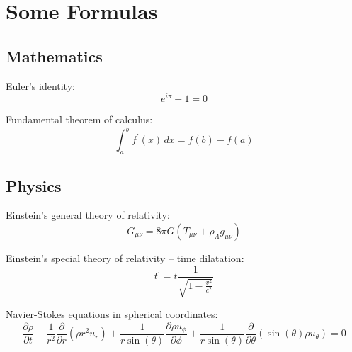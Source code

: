 \section{Some Formulas}

\subsection{Mathematics}

Euler's identity:
\begin{equation}
   e^{i\pi} + 1 = 0
\label{eq:euler-identity}
\end{equation}

Fundamental theorem of calculus:
\begin{equation}
   \int_a^b f^\prime\!\left(x\right)\,dx = f\!\left(b\right) - f\!\left(a\right)
\label{eq:fundamental-theorem}
\end{equation}

\subsection{Physics}

Einstein's general theory of relativity:
\begin{equation}
   G_{\mu\nu} = 8 \pi G \left(T_{\mu\nu} + \rho_\Lambda g_{\mu\nu}\right)
\label{eq:general-relativity}
\end{equation}

Einstein's special theory of relativity -- time dilatation:
\begin{equation}
   t^\prime = t \frac{1}{\sqrt{1-\frac{v^2}{c^2}}}
\label{eq:}
\end{equation}

Navier-Stokes equations in spherical coordinates:
\begin{equation}
  \frac{\partial \rho}{\partial t} + \frac{1}{r^2}\frac{\partial}{\partial r}\left(\rho r^2 u_r\right) +
  \frac{1}{r \sin(\theta)}\frac{\partial \rho u_\phi}{\partial \phi} +
  \frac{1}{r \sin(\theta)}\frac{\partial}{\partial \theta}\left(\sin(\theta) \rho u_\theta\right)
     = 0
\label{eq:navier-stokes-continuity}
\end{equation}

